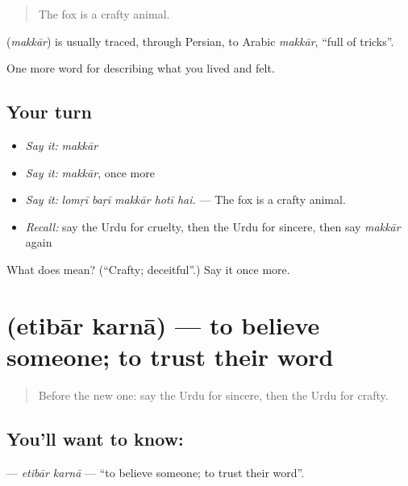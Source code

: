 \begin{quote}
The fox is a crafty animal.
\end{quote}

\begin{cousinweb}
\textbf{} (\emph{makkār}) is usually traced, through Persian, to Arabic \emph{makkār}, \textquotedblleft{}full of tricks\textquotedblright{}.
\end{cousinweb}

\begin{grammarlens}[title={What you've built}]
One more word for describing what you lived and felt.
\end{grammarlens}

\subsection*{Your turn}
\begin{itemize}
\raggedright
  \item \emph{Say it:} \emph{makkār}
  \item \emph{Say it:} \emph{makkār}, once more
  \item \emph{Say it:} \emph{lomṛī baṛī makkār hotī hai.} — The fox is a crafty animal.
  \item \emph{Recall:} say the Urdu for cruelty, then the Urdu for sincere, then say \emph{makkār} again
\end{itemize}

\begin{tcolorbox}[breakable,colback=teal!4,colframe=teal!35!black,title={Before you move on}]
What does  mean? (\textquotedblleft{}Crafty; deceitful\textquotedblright{}.) Say it once more.
\end{tcolorbox}
\section[\texorpdfstring{\ur{اعتبار} \ur{کرنا} (etibār karnā)}{اعتبار کرنا (etibār karnā)}]{  (etibār karnā) — to believe someone; to trust their word}

\label{lesson:UR-C457-etibar-karna}



\begin{quote}
Before the new one: say the Urdu for sincere, then the Urdu for crafty.
\end{quote}

\subsection*{You'll want to know:  }
\textbf{ } — \emph{etibār karnā} — \textquotedblleft{}to believe someone; to trust their word\textquotedblright{}.

